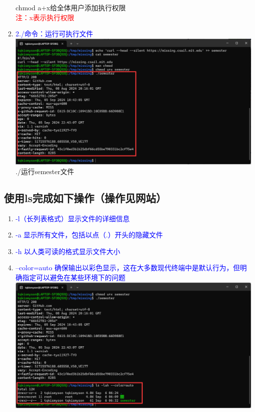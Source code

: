 \documentclass[12pt,a4paper,UTF8]{article}
\begin{document}
\begin{enumerate}
        chmod a+x给全体用户添加执行权限\\[6pt]
        \textcolor{red}{注：x表示执行权限}\\
        \item \textcolor{blue}{2./命令：运行可执行文件}
        \includegraphics[scale=0.25]{pictures/Shell/4_4.png} 
        ./运行semester文件\\[8pt]
    \end{enumerate}
    \subsection{使用ls完成如下操作（操作见网站）}
    \begin{enumerate}
        \item \textcolor{blue}{-l（长列表格式）显示文件的详细信息}\\
        \item \textcolor{blue}{-a 显示所有文件，包括以点（.）开头的隐藏文件}\\
        \item \textcolor{blue}{-h 以人类可读的格式显示文件大小}\\
        \item \textcolor{blue}{--color=auto 确保输出以彩色显示，这在大多数现代终端中是默认行为，但明确指定可以避免在某些环境下的问题}\\[8pt]
        \includegraphics[scale=0.25]{pictures/Shell/5_1.png}  
    \end{enumerate}
\end{document}
